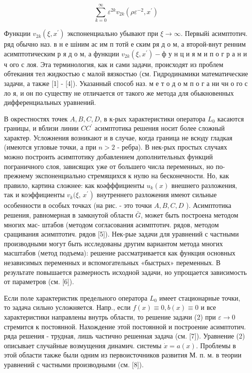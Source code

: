\documentclass[10pt]{article}
\begin{document}
\[

\sum_{k=0}^{\infty} \varepsilon^{2 k} v_{2 k}\left(\rho \varepsilon^{-2}, x^{\prime}\right)

\]



Функции $v_{2 k}\left(\xi, x^{\prime}\right)$ экспоненциально убывают при $\xi \rightarrow \infty$. Первыйі асимптотич. ряд обычно наз. в н е шіним ас им п тотй е ским ря д о м, а второй-внут ренним асимптотическим р я д о м, а функции $v_{2 k}\left(\xi, x^{\prime}\right)-ф$ у н ц и я м и п о г р а н и ч ого с лоя. Эта терминология, как и сами задачи, происходят из проблем обтекания тел жидкостью с малой вязкостью (см. Гидродинамики математические задачи, а также [1] - [4]). Указанный способ наз. м е т о д о м п о г а ни чн о го с ло я, и он по существу не отличается от такого же метода для обыкновенных дифференциальных уравнений.



В окрестностях точек $A, B, C, D$, в к-рых характеристики оператора $L_{0}$ касаются границы, и вблизи линии $C C^{\prime}$ асимптотика решения носит более сложный характер. Усложнения возникают и в случае, когда граница не всюду гладкая (имеются угловые точки, а при $n>2$ - ребра). В нек-рых простых случаях можно построить асимптотику добавлением дополнительных функций пограничного слоя, зависящих уже от большего числа переменных, но по-прежнему экспоненциально стремящихся к нулю на бесконечности. Но, как правило, картина сложнее: как коәфффициенты $u_{k}(x)$ внешнего разложения, так и коэффициенты $v_{k}(\xi$, $\left.x^{\prime}\right)$ внутреннего разложения имеют сильные особенности в особых точках (на рис. - это точки $A, B, C, D$ ). Асимптотика решения, равномерная в замкнутой области $\bar{G}$, может быть построена методом многих мас- штабов (методом согласования асимптотич. рядов, методом сращивания асимптотич. рядов [5]). Нек-рые задачи для уравнений с частными производными могут быть исследованы другим вариантом метода многих масштабов (метод подъема): решение рассматривается как функция основных независимых переменных и вспомогательных «быстрых» переменных. В результате повышается размерность исходной задачи, но упрощается зависимость от параметров (см. [6]).



Если поле характеристик предельного оператора $L_{0}$ имеет стационарные точки, то задача сильно усложняется. Напр., если $f(x) \equiv 0, b(x) \equiv 0$ и все характеристики направлены внутрь области, то решение задачи (2) при $\varepsilon \rightarrow 0$ стремится к постоянной. Нахождение этой постоянной и построение асимптотич. ряда решения - трудная, лишь частично решенная задача (см. [7]). Уравнение (2) описывает случайные возмущения динамич. системы $\dot{x}=a(x)$. Проблемы в этой области также были одним из первоисточников развития М. п. м. в теории уравнений с частными производными (см. [8]).
\end{document}
